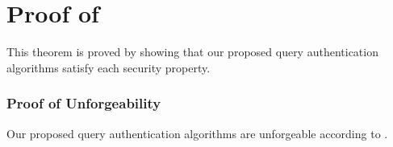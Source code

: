 \chapter{Proof of \texorpdfstring{}{Theorem~\ref{thm:access-control:sec}}}%
\label{app:access-control-sec}

\querysecuritytheorem*

This theorem is proved by showing that our proposed query authentication algorithms satisfy each security property.

\subsection{Proof of Unforgeability}

\begin{lemma}\label{lemma:access-control:query-secure}
    Our proposed query authentication algorithms are unforgeable according to .
\end{lemma}

